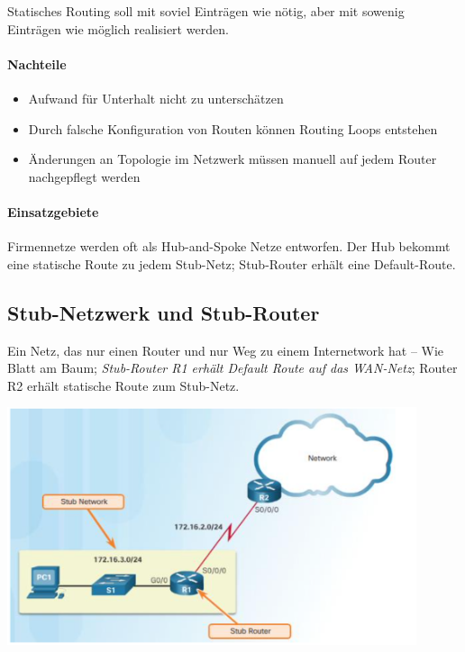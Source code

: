 \documentclass[a4paper,12pt]{article}
\begin{document}
Statisches Routing soll mit soviel Einträgen wie nötig, aber mit sowenig Einträgen wie möglich realisiert werden.

\paragraph{Nachteile}
\begin{itemize}
\item Aufwand für Unterhalt nicht zu unterschätzen
\item Durch falsche Konfiguration von Routen können Routing Loops entstehen
\item Änderungen an Topologie im Netzwerk müssen manuell auf jedem Router nachgepflegt werden
\end{itemize}


\paragraph{Einsatzgebiete} Firmennetze werden oft als Hub-and-Spoke Netze entworfen. Der Hub bekommt eine statische Route zu jedem Stub-Netz; Stub-Router erhält eine Default-Route.


\subsection{Stub-Netzwerk und Stub-Router}
Ein Netz, das nur einen Router und nur Weg zu einem Internetwork hat -- Wie Blatt am Baum; \emph{Stub-Router R1 erhält Default Route auf das WAN-Netz}; Router R2 erhält statische Route zum Stub-Netz.

\begin{center}
\includegraphics[width=12cm]{img/12_stub.png}
\end{center}
\end{document}
